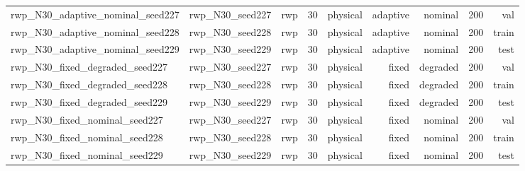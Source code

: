 \begin{tabular}{lrrrrrrrr}
rwp\_N30\_adaptive\_nominal\_seed227 & rwp\_N30\_seed227 & rwp & 30 & physical & adaptive & nominal & 200 & val \\
rwp\_N30\_adaptive\_nominal\_seed228 & rwp\_N30\_seed228 & rwp & 30 & physical & adaptive & nominal & 200 & train \\
rwp\_N30\_adaptive\_nominal\_seed229 & rwp\_N30\_seed229 & rwp & 30 & physical & adaptive & nominal & 200 & test \\
rwp\_N30\_fixed\_degraded\_seed227 & rwp\_N30\_seed227 & rwp & 30 & physical & fixed & degraded & 200 & val \\
rwp\_N30\_fixed\_degraded\_seed228 & rwp\_N30\_seed228 & rwp & 30 & physical & fixed & degraded & 200 & train \\
rwp\_N30\_fixed\_degraded\_seed229 & rwp\_N30\_seed229 & rwp & 30 & physical & fixed & degraded & 200 & test \\
rwp\_N30\_fixed\_nominal\_seed227 & rwp\_N30\_seed227 & rwp & 30 & physical & fixed & nominal & 200 & val \\
rwp\_N30\_fixed\_nominal\_seed228 & rwp\_N30\_seed228 & rwp & 30 & physical & fixed & nominal & 200 & train \\
rwp\_N30\_fixed\_nominal\_seed229 & rwp\_N30\_seed229 & rwp & 30 & physical & fixed & nominal & 200 & test \\
\bottomrule
\end{tabular}